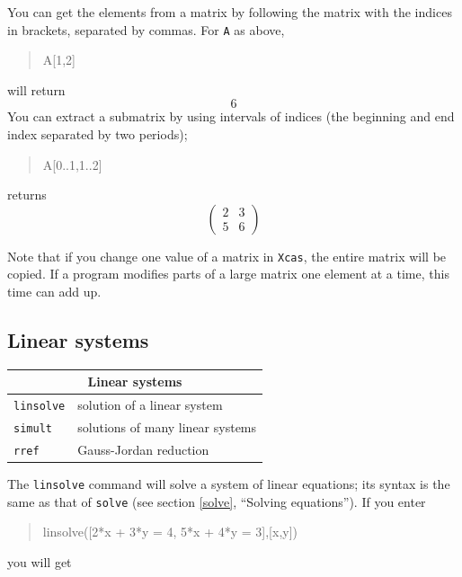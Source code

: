 \documentclass{article}
\newcommand{\xcasin}[1]
{\begin{quote}\ttfamily
#1
\end{quote}}
\newcommand{\xcasout}[1]
{\begin{equation*}
#1
\end{equation*}}
\begin{document}
You can get the elements from a matrix by following the matrix with
the indices in brackets, separated by commas.  For \texttt{A} as above,
\xcasin{A[1,2]}
will return
\xcasout{6}
You can extract a submatrix by using intervals of indices (the
beginning and end index separated by two periods);
\xcasin{A[0..1,1..2]}
returns
\xcasout{
\begin{pmatrix}
2 & 3\\
5 & 6
\end{pmatrix}}

Note that if you change one value of a matrix in \texttt{Xcas}, the
entire matrix will be copied.  If a program modifies parts of a large
matrix one element at a time, this time can add up.


\subsection{Linear systems}

\begin{center}
\begin{tabular}{|p{}|p{}|}
\hline
\multicolumn{2}{|c|}{\bf Linear systems}\\
\hline\hline
\texttt{linsolve} & solution of a linear system\\
\texttt{simult} & solutions of many linear systems\\
\texttt{rref} & Gauss-Jordan reduction\\
\hline
\end{tabular}
\end{center}

The \texttt{linsolve} command will solve a system of linear equations;
its syntax is the same as that of \texttt{solve} (see section
\ref{solve}, ``Solving equations'').
If you enter
\xcasin{linsolve([2*x + 3*y = 4, 5*x + 4*y = 3],[x,y])}
you will get
\xcasout{[-1,2]}
\end{document}
